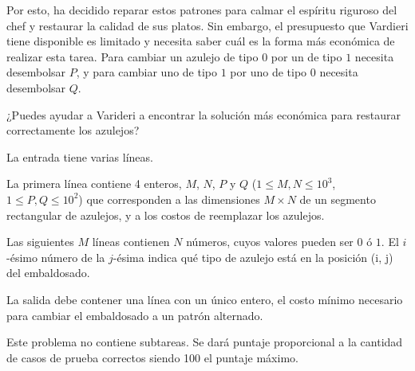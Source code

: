 \documentclass{oci}
\begin{document}
\begin{problemDescription}
Por esto, ha decidido reparar estos patrones para calmar el espíritu riguroso del chef y restaurar la calidad de sus platos.
Sin embargo, el presupuesto que Vardieri tiene disponible es limitado y necesita saber cuál es la forma más económica de realizar esta tarea.
Para cambiar un azulejo de tipo $0$ por un de tipo $1$ necesita desembolsar $P$, y para cambiar uno de tipo $1$ por uno de tipo $0$ necesita desembolsar $Q$.

¿Puedes ayudar a Varideri a encontrar la solución más económica para restaurar correctamente los azulejos?

\end{problemDescription}

\begin{inputDescription}
La entrada tiene varias líneas.

La primera línea contiene 4 enteros, $M$, $N$, $P$ y $Q$ ($1 \le M, N \le 10^3$, $1 \le P, Q \le 10^2$) que corresponden a las dimensiones $M \times N$ de un segmento rectangular de azulejos, y a los costos de reemplazar los azulejos.

Las siguientes $M$ líneas contienen $N$ números, cuyos valores pueden ser $0$ ó $1$.
El $i$-ésimo número de la $j$-ésima indica qué tipo de azulejo está en la posición (i, j) del embaldosado.
\end{inputDescription}

\begin{outputDescription}
La salida debe contener una línea con un único entero, el costo mínimo necesario para cambiar el embaldosado a un patrón alternado.
\end{outputDescription}

\begin{scoreDescription}
  Este problema no contiene subtareas.
  Se dará puntaje proporcional a la cantidad de casos de prueba correctos siendo
  100 el puntaje máximo.
\end{scoreDescription}

\begin{sampleDescription}
\end{sampleDescription}
\end{document}
